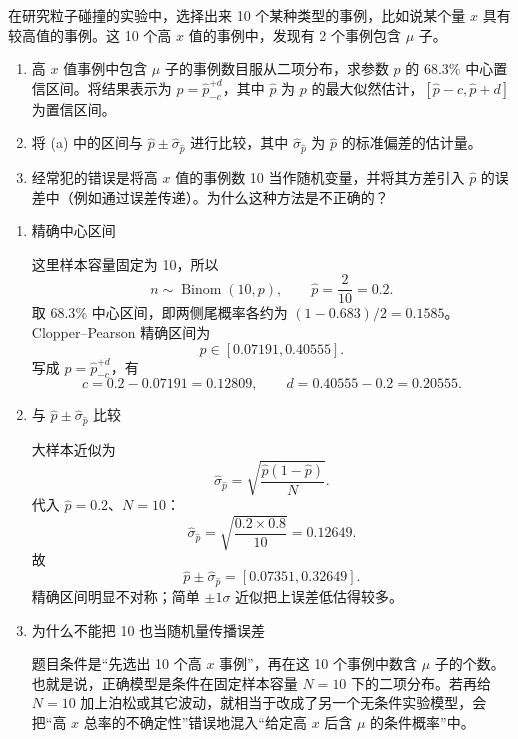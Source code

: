 \begin{question}
在研究粒子碰撞的实验中，选择出来 10 个某种类型的事例，比如说某个量 \(x\)
具有较高值的事例。这 10 个高 \(x\) 值的事例中，发现有 2 个事例包含
\(\mu\) 子。

\begin{enumerate}
\item
  高 \(x\) 值事例中包含 \(\mu\) 子的事例数目服从二项分布，求参数 \(p\)
  的 68.3\% 中心置信区间。将结果表示为 \(p=\hat p^{+d}_{-c}\)，其中
  \(\hat p\) 为 \(p\) 的最大似然估计，\([\hat p-c,\hat p+d]\)
  为置信区间。
\item
  将 (a) 中的区间与 \(\hat p\pm\hat\sigma_{\hat p}\) 进行比较，其中
  \(\hat\sigma_{\hat p}\) 为 \(\hat p\) 的标准偏差的估计量。
\item
  经常犯的错误是将高 \(x\) 值的事例数 10 当作随机变量，并将其方差引入
  \(\hat p\) 的误差中（例如通过误差传递）。为什么这种方法是不正确的？
\end{enumerate}
\begin{solution}
\begin{enumerate}
\item 精确中心区间

这里样本容量固定为 10，所以
\[
n\sim\operatorname{Binom}(10,p),
\qquad
\hat p=\frac{2}{10}=0.2.
\]
取 \(68.3\%\) 中心区间，即两侧尾概率各约为 \((1-0.683)/2=0.1585\)。
Clopper--Pearson 精确区间为
\[
p\in[0.07191,0.40555].
\]
写成 \(p=\hat p^{+d}_{-c}\)，有
\[
c=0.2-0.07191=0.12809,
\qquad
d=0.40555-0.2=0.20555.
\]

\item 与 \(\hat p\pm\hat\sigma_{\hat p}\) 比较

大样本近似为
\[
\hat\sigma_{\hat p}=\sqrt{\frac{\hat p(1-\hat p)}{N}}.
\]
代入 \(\hat p=0.2\)、\(N=10\)：
\[
\hat\sigma_{\hat p}=\sqrt{\frac{0.2\times0.8}{10}}=0.12649.
\]
故
\[
\hat p\pm\hat\sigma_{\hat p}=[0.07351,0.32649].
\]
精确区间明显不对称；简单 \(\pm1\sigma\) 近似把上误差低估得较多。

\item 为什么不能把 10 也当随机量传播误差

题目条件是“先选出 10 个高 \(x\) 事例”，再在这 10 个事例中数含 \(\mu\) 子的个数。也就是说，正确模型是条件在固定样本容量 \(N=10\) 下的二项分布。若再给 \(N=10\) 加上泊松或其它波动，就相当于改成了另一个无条件实验模型，会把“高 \(x\) 总率的不确定性”错误地混入“给定高 \(x\) 后含 \(\mu\) 的条件概率”中。
\end{enumerate}
\end{solution}
\end{question}


